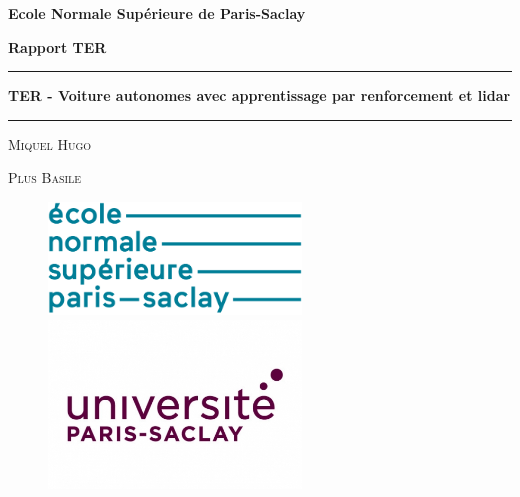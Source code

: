 \documentclass{article}
\begin{document}
\begin{center}
    \textbf{\LARGE{Ecole Normale Supérieure de Paris-Saclay}}\\
\end{center}

\vspace{1cm}

\begin{center}
    \textbf{Rapport TER}
\end{center}

\noindent\rule{\textwidth}{0.6mm}
\bigskip
\begin{center}
    \textbf{\LARGE{TER - Voiture autonomes avec apprentissage par renforcement et lidar}}
\end{center}
\bigskip
\noindent\rule{\textwidth}{0.6mm}

\bigskip
\begin{center}
    \textsc{Miquel Hugo}
\end{center}
\begin{center}
    \textsc{Plus Basile}
\end{center}

\begin{figure}[b]
    \centering
    \begin{minipage}[h]{0.45\textwidth}
        \raggedright
        \includegraphics[width=0.6\textwidth]{Images/Logo-ENS-Paris-Saclay.png}
    \end{minipage}
    \begin{minipage}[h]{0.45\textwidth}
        \raggedleft
        \includegraphics[width=0.6\textwidth]{Images/Logo-Universite-Paris-Saclay.jpg}
    \end{minipage}
\end{figure}
\end{document}
